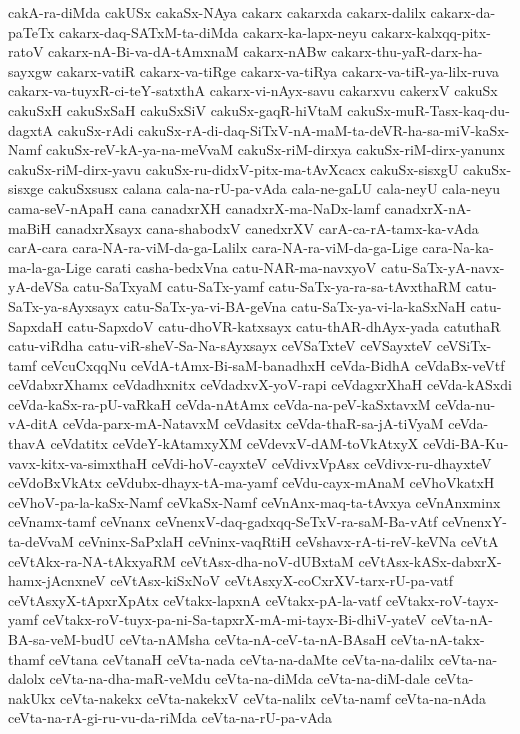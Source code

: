 {cakA-ra-diMda
cakUSx
cakaSx-NAya
cakarx
cakarxda
cakarx-dalilx
cakarx-da-paTeTx
cakarx-daq-SATxM-ta-diMda
cakarx-ka-lapx-neyu
cakarx-kalxqq-pitx-ratoV
cakarx-nA-Bi-va-dA-tAmxnaM
cakarx-nABw
cakarx-thu-yaR-darx-ha-sayxgw
cakarx-vatiR
cakarx-va-tiRge
cakarx-va-tiRya
cakarx-va-tiR-ya-lilx-ruva
cakarx-va-tuyxR-ci-teY-satxthA
cakarx-vi-nAyx-savu
cakarxvu
cakerxV
cakuSx
cakuSxH
cakuSxSaH
cakuSxSiV
cakuSx-gaqR-hiVtaM
cakuSx-muR-Tasx-kaq-du-dagxtA
cakuSx-rAdi
cakuSx-rA-di-daq-SiTxV-nA-maM-ta-deVR-ha-sa-miV-kaSx-Namf
cakuSx-reV-kA-ya-na-meVvaM
cakuSx-riM-dirxya
cakuSx-riM-dirx-yanunx
cakuSx-riM-dirx-yavu
cakuSx-ru-didxV-pitx-ma-tAvXcacx
cakuSx-sisxgU
cakuSx-sisxge
cakuSxsusx
calana
cala-na-rU-pa-vAda
cala-ne-gaLU
cala-neyU
cala-neyu
cama-seV-nApaH
cana
canadxrXH
canadxrX-ma-NaDx-lamf
canadxrX-nA-maBiH
canadxrXsayx
cana-shabodxV
canedxrXV
carA-ca-rA-tamx-ka-vAda
carA-cara
cara-NA-ra-viM-da-ga-Lalilx
cara-NA-ra-viM-da-ga-Lige
cara-Na-ka-ma-la-ga-Lige
carati
casha-bedxVna
catu-NAR-ma-navxyoV
catu-SaTx-yA-navx-yA-deVSa
catu-SaTxyaM
catu-SaTx-yamf
catu-SaTx-ya-ra-sa-tAvxthaRM
catu-SaTx-ya-sAyxsayx
catu-SaTx-ya-vi-BA-geVna
catu-SaTx-ya-vi-la-kaSxNaH
catu-SapxdaH
catu-SapxdoV
catu-dhoVR-katxsayx
catu-thAR-dhAyx-yada
catuthaR
catu-viRdha
catu-viR-sheV-Sa-Na-sAyxsayx
ceVSaTxteV
ceVSayxteV
ceVSiTx-tamf
ceVcuCxqqNu
ceVdA-tAmx-Bi-saM-banadhxH
ceVda-BidhA
ceVdaBx-veVtf
ceVdabxrXhamx
ceVdadhxnitx
ceVdadxvX-yoV-rapi
ceVdagxrXhaH
ceVda-kASxdi
ceVda-kaSx-ra-pU-vaRkaH
ceVda-nAtAmx
ceVda-na-peV-kaSxtavxM
ceVda-nu-vA-ditA
ceVda-parx-mA-NatavxM
ceVdasitx
ceVda-thaR-sa-jA-tiVyaM
ceVda-thavA
ceVdatitx
ceVdeY-kAtamxyXM
ceVdevxV-dAM-toVkAtxyX
ceVdi-BA-Ku-vavx-kitx-va-simxthaH
ceVdi-hoV-cayxteV
ceVdivxVpAsx
ceVdivx-ru-dhayxteV
ceVdoBxVkAtx
ceVdubx-dhayx-tA-ma-yamf
ceVdu-cayx-mAnaM
ceVhoVkatxH
ceVhoV-pa-la-kaSx-Namf
ceVkaSx-Namf
ceVnAnx-maq-ta-tAvxya
ceVnAnxminx
ceVnamx-tamf
ceVnanx
ceVnenxV-daq-gadxqq-SeTxV-ra-saM-Ba-vAtf
ceVnenxY-ta-deVvaM
ceVninx-SaPxlaH
ceVninx-vaqRtiH
ceVshavx-rA-ti-reV-keVNa
ceVtA
ceVtAkx-ra-NA-tAkxyaRM
ceVtAsx-dha-noV-dUBxtaM
ceVtAsx-kASx-dabxrX-hamx-jAcnxneV
ceVtAsx-kiSxNoV
ceVtAsxyX-coCxrXV-tarx-rU-pa-vatf
ceVtAsxyX-tApxrXpAtx
ceVtakx-lapxnA
ceVtakx-pA-la-vatf
ceVtakx-roV-tayx-yamf
ceVtakx-roV-tuyx-pa-ni-Sa-tapxrX-mA-mi-tayx-Bi-dhiV-yateV
ceVta-nA-BA-sa-veM-budU
ceVta-nAMsha
ceVta-nA-ceV-ta-nA-BAsaH
ceVta-nA-takx-thamf
ceVtana
ceVtanaH
ceVta-nada
ceVta-na-daMte
ceVta-na-dalilx
ceVta-na-dalolx
ceVta-na-dha-maR-veMdu
ceVta-na-diMda
ceVta-na-diM-dale
ceVta-nakUkx
ceVta-nakekx
ceVta-nakekxV
ceVta-nalilx
ceVta-namf
ceVta-na-nAda
ceVta-na-rA-gi-ru-vu-da-riMda
ceVta-na-rU-pa-vAda
}
